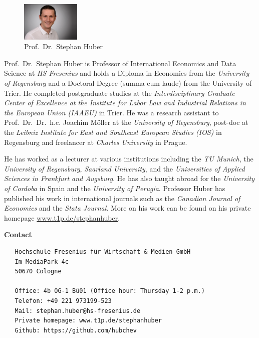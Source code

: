 \documentclass[
  12pt,
  oneside]{book}
\begin{document}
\begin{figure}
\centering
\includegraphics[width=0.25\textwidth,height=\textheight]{fig/huber2.jpeg}
\caption[\label{fig:itsme} Prof.~Dr.~Stephan Huber]{\label{fig:itsme} Prof.~Dr.~Stephan Huber\footnotemark{}}
\end{figure}

Prof.~Dr.~Stephan Huber is Professor of International Economics and Data Science at \emph{HS Fresenius} and holds a Diploma in Economics from the \emph{University of Regensburg} and a Doctoral Degree (summa cum laude) from the University of Trier. He completed postgraduate studies at the \emph{Interdisciplinary Graduate Center of Excellence at the Institute for Labor Law and Industrial Relations in the European Union (IAAEU)} in Trier. He was a research assistant to Prof.~Dr.~Dr.~h.c. Joachim Möller at the \emph{University of Regensburg}, post-doc at the \emph{Leibniz Institute for East and Southeast European Studies (IOS)} in Regensburg and freelancer at \emph{Charles University} in Prague.

He has worked as a lecturer at various institutions including the \emph{TU Munich}, the \emph{University of Regensburg}, \emph{Saarland University}, and the \emph{Universities of Applied Sciences in Frankfurt and Augsburg}. He has also taught abroad for the \emph{University of Cordoba} in Spain and the \emph{University of Perugia}. Professor Huber has published his work in international journals such as the \emph{Canadian Journal of Economics} and the \emph{Stata Journal}. More on his work can be found on his private homepage \href{https://www.t1p.de/stephanhuber}{www.t1p.de/stephanhuber}.

\textbf{Contact}

\begin{verbatim}
   Hochschule Fresenius für Wirtschaft & Medien GmbH
   Im MediaPark 4c
   50670 Cologne
   
   Office: 4b OG-1 Bü01 (Office hour: Thursday 1-2 p.m.)
   Telefon: +49 221 973199-523
   Mail: stephan.huber@hs-fresenius.de
   Private homepage: www.t1p.de/stephanhuber
   Github: https://github.com/hubchev
\end{verbatim}
\end{document}
